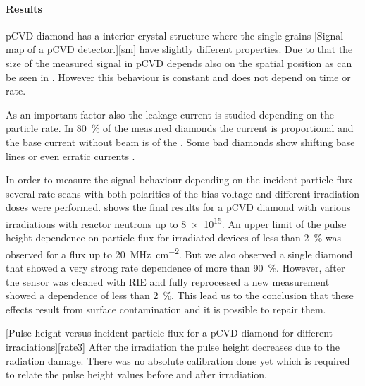 \paragraph{Results}
\ac{pCVD} diamond has a interior crystal structure where the single grains 
[Signal map of a \ac{pCVD} detector.][sm]
have slightly different properties. Due to that the size of the measured signal in \ac{pCVD} depends also on the spatial position as can be seen in . However this behaviour is constant and does not depend on time or rate.\par
As an important factor also the leakage current is studied depending on the particle rate. In \SI{80}{\%} of the measured diamonds the current is proportional and the base current without beam is of the . Some bad diamonds show shifting base lines or even erratic currents \cite{erratic}.\par
In order to measure the signal behaviour depending on the incident particle flux several rate scans with both polarities of the bias voltage and different irradiation doses were performed.  shows the final results for a \ac{pCVD} diamond with various irradiations with reactor neutrons up to \SI{8e15}{\ncm}. An upper limit of the pulse height dependence on particle flux for irradiated devices of less than \SI{2}{\%} was observed for a flux up to \SI{20}{\mega\hertz\per cm^2}. But we also observed a single diamond that showed a very strong rate dependence of more than \SI{90}{\%}. However, after the sensor was cleaned with \ac{RIE} and fully reprocessed a new measurement showed a dependence of less than \SI{2}{\%}. This lead us to the conclusion that these effects result from surface contamination and it is possible to repair them.\par
{}[Pulse height versus incident particle flux for a \ac{pCVD} diamond for different irradiations][rate3]
After the irradiation the pulse height decreases due to the radiation damage. There was no absolute calibration done yet which is required to relate the pulse height values before and after irradiation.\par
